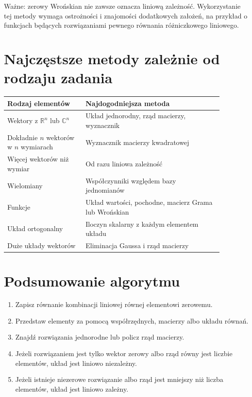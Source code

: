 \documentclass{article}
\begin{document}
Ważne: zerowy Wrońskian nie zawsze oznacza liniową zależność. Wykorzystanie tej metody wymaga ostrożności i znajomości dodatkowych założeń, na przykład o funkcjach będących rozwiązaniami pewnego równania różniczkowego liniowego.

\section{Najczęstsze metody zależnie od rodzaju zadania}

\begin{center}
\begin{tabular}{|p{0.32\linewidth}|p{0.56\linewidth}|}
\hline
\textbf{Rodzaj elementów} & \textbf{Najdogodniejsza metoda} \\
\hline
Wektory z $\mathbb R^n$ lub $\mathbb C^n$ & Układ jednorodny, rząd macierzy, wyznacznik \\
\hline
Dokładnie $n$ wektorów w $n$ wymiarach & Wyznacznik macierzy kwadratowej \\
\hline
Więcej wektorów niż wymiar & Od razu liniowa zależność \\
\hline
Wielomiany & Współczynniki względem bazy jednomianów \\
\hline
Funkcje & Układ wartości, pochodne, macierz Grama lub Wrońskian \\
\hline
Układ ortogonalny & Iloczyn skalarny z każdym elementem układu \\
\hline
Duże układy wektorów & Eliminacja Gaussa i rząd macierzy \\
\hline
\end{tabular}
\end{center}

\section{Podsumowanie algorytmu}
\begin{enumerate}
    \item Zapisz równanie kombinacji liniowej równej elementowi zerowemu.
    \item Przedstaw elementy za pomocą współrzędnych, macierzy albo układu równań.
    \item Znajdź rozwiązania jednorodne lub policz rząd macierzy.
    \item Jeżeli rozwiązaniem jest tylko wektor zerowy albo rząd równy jest liczbie elementów, układ jest liniowo niezależny.
    \item Jeżeli istnieje niezerowe rozwiązanie albo rząd jest mniejszy niż liczba elementów, układ jest liniowo zależny.
\end{enumerate}
\end{document}
